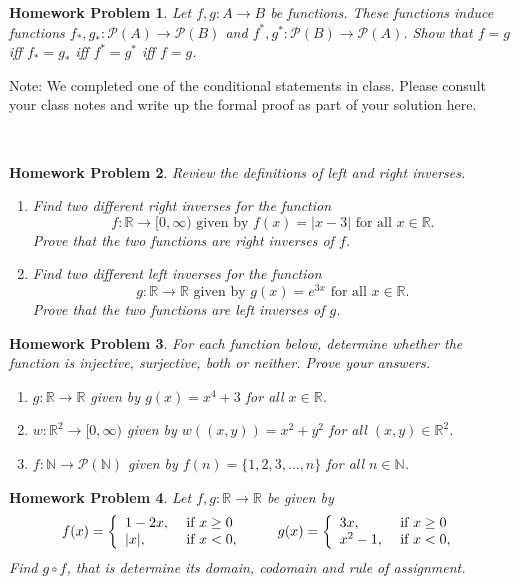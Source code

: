 \documentclass{article}
\newtheorem{hw}{Homework Problem}
\newcommand{\R}{\mathbb{R}}
\newcommand{\N}{\mathbb{N}}
\begin{document}
	\begin{hw}
		Let $f, g: A\rightarrow B$ be functions. These functions induce  \newline  functions $f_*, g_*: \mathcal{P}(A) \rightarrow \mathcal{P}(B)$ and $f^*, g^*: \mathcal{P}(B) \rightarrow \mathcal{P}(A)$.
		Show that $f=g$ iff $f_* = g_*$ iff $f^{*} = g^{*}$ iff $f = g$.
	\end{hw}
	Note: We completed one of the conditional statements in class. Please consult your class notes and write up the formal proof as part of your solution here.

	\underline{\hspace{5in}}


	\
	\begin{hw}
		Review the definitions of left and right inverses.
		\begin{enumerate}
			\item[(i)] Find two different right inverses for the function $$f:\R \rightarrow [0,\infty) \textrm{ given by } f(x) = |x-3|  \textrm{ for all } x\in \R.$$  Prove that the two functions are right inverses of $f$.
			\item[(ii)] Find two different left inverses for the function $$g: \R \rightarrow \R  \textrm{ given by  }  g(x) = e^{3x} \textrm{ for all } x \in \R.$$  Prove that the two functions are left inverses of $g$.
		\end{enumerate}
	\end{hw}
	\begin{hw}
		For each function below, determine whether the function is injective, surjective, both or neither. Prove your answers.
		\begin{enumerate}
			\item[$(i)$] $g: \R \rightarrow \R$ given by $g(x) = x^4+3$ for all $x\in \mathbb{R}$.
			\item[$(ii)$] $w: \R^2 \rightarrow [0,\infty) $ given by $w((x, y)) = x^2 + y^2$ for all $(x, y) \in \R^2$.
			\item[$(iii)$] $f: \N \rightarrow \mathcal{P}(\N)$ given by $f(n) = \{1, 2, 3, \dots, n\}$ for all $n \in \N$.
		\end{enumerate}
	\end{hw}
	\begin{hw}
		Let $f, g: \R \rightarrow \R$ be given by
		$$f(x) = \left\{
					 \begin{array}{ll}
						 1-2x, & \textrm{ if } x\geq 0     \\
						 |x|, & \textrm{ if } x <0,
					 \end{array}
		\right.
		\hspace{.3in}
		g(x) = \left\{
				   \begin{array}{ll}
					   3x, & \textrm{ if } x\geq 0     \\
					   x^2-1, & \textrm{ if } x <0,
				   \end{array}
		\right.
		$$
		Find $g \circ f$, that is determine its domain, codomain and rule of assignment.
	\end{hw}
\end{document}
